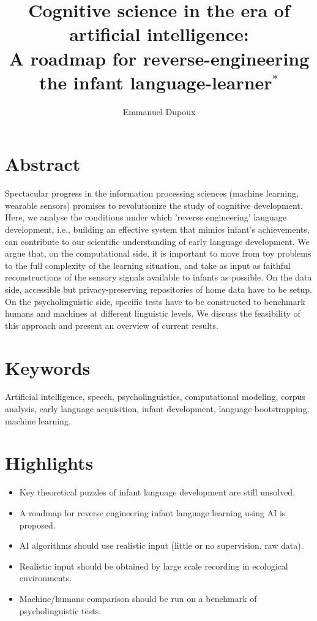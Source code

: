 \documentclass[jou,apacite]{apa6}
\title{Cognitive science in the era of artificial intelligence: \\A roadmap for reverse-engineering the infant language-learner$^*$}
\author{Emmanuel Dupoux}
\affiliation{EHESS, ENS, PSL Research University, CNRS, INRIA, Paris, France\\ emmanuel.dupoux@gmail.com, www.syntheticlearner.net
	\ifthenelse{\equal{\jou}{1}}{}{~\\
		~\\
		~\\
		~\\
		~\\
		\begin{flushleft}
		\end{flushleft}
	}
}
\newcommand{\jou}{1}
\begin{document}
	
	
	\newcommand{\citeM}[1]{(REF #1)}
	
	
	\maketitle    
	





    \ifthenelse{\equal{\jou}{0}}{\newpage}{}
	


	\section*{Abstract}

Spectacular progress in the information processing sciences (machine learning, wearable sensors) promises to revolutionize the study of cognitive development. Here, we analyse the conditions under which  'reverse engineering' language development, i.e., building an effective system that mimics infant's achievements, can contribute to our scientific understanding of early language development. We argue that, on the computational side, it is important to move from toy problems to the full complexity of the learning situation, and take as input as faithful reconstructions of the sensory signals available to infants as possible. On the data side, accessible but privacy-preserving repositories of home data have to be setup. On the psycholinguistic side, specific tests have to be constructed to benchmark humans and machines at different linguistic levels.  We discuss the feasibility of this approach and present an overview of current results.
	
	\section*{Keywords}
	Artificial intelligence, speech, psycholinguistics, computational modeling, corpus analysis, early language acquisition, infant development, language bootstrapping, machine learning.
	
\section*{Highlights}
\begin{itemize}




\item Key theoretical puzzles of infant language development are still unsolved.
\item A roadmap for reverse engineering infant language learning using AI is proposed.
\item AI algorithms should use realistic input (little or no supervision, raw data).
\item Realistic input should be obtained by large scale recording in ecological environments.
\item Machine/humans comparison should be run on a benchmark of psycholinguistic tests.
\end{itemize}
\ifthenelse{\equal{\jou}{0}}{\newpage}{}
\end{document}
